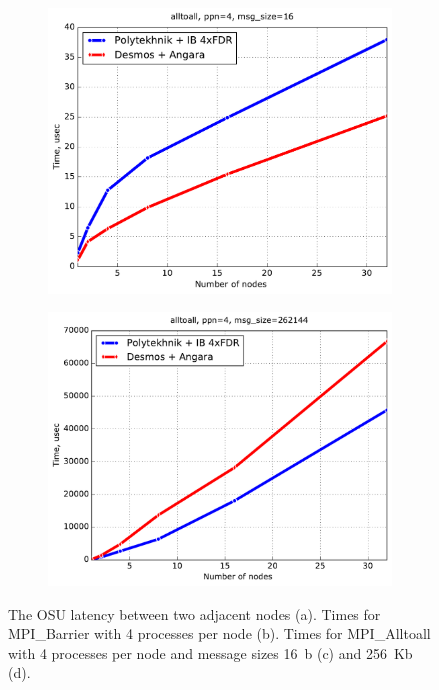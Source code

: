 \documentclass{llncs}
\begin{document}
\begin{figure}[th!]
\begin{subfigure}{0.45\textwidth}
  \includegraphics[width=1\textwidth]{img/alltoall_ppn=4_size=16.pdf}\caption{\label{fig:alltoall_small}}
  \end{subfigure}
  \begin{subfigure}{0.45\textwidth}
  \includegraphics[width=1\textwidth]{img/alltoall_ppn=4_size=262144.pdf}\caption{\label{fig:alltoall_large}}
   \end{subfigure}
\caption{ The OSU latency between two adjacent nodes (a). Times for MPI\_Barrier with 4 processes per node (b). Times for MPI\_Alltoall with 4 processes per node and message sizes 16~b (c) and 256~Kb (d).}
\end{figure}
\end{document}
